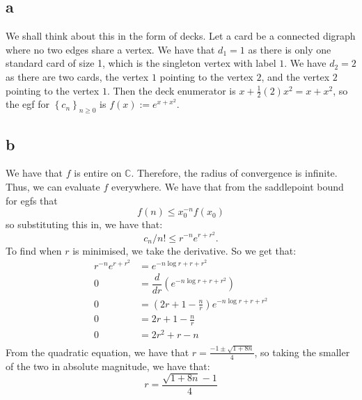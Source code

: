 \documentclass[]{article}
\begin{document}
\subsection{a}
We shall think about this in the form of decks. Let a card be a connected digraph where no two edges share a vertex. We have that $d_1 = 1$ as there is only one standard card of size 1, which is the singleton vertex with label $1$. We have $d_2 = 2$ as there are two cards, the vertex $1$ pointing to the vertex $2$, and the vertex $2$ pointing to the vertex $1$. Then the deck enumerator is $x + \frac{1}{2} (2) x^2 = x + x^2$, so the egf for $\left\{ c_n\right\}_{n \geq 0}$ is $f(x) := e^{x + x^2}$.

\subsection{b}
We have that $f$ is entire on $\mathbb{C}$. Therefore, the radius of convergence is infinite. Thus, we can evaluate $f$ everywhere. We have that from the saddlepoint bound for egfs that
\begin{equation}
	[x^n] f(n) \leq x_0^{-n} f(x_0)
\end{equation}
so substituting this in, we have that:
\begin{equation}
	c_n/n! \leq r^{-n} e^{r + r^2}.
\end{equation}
To find when $r$ is minimised, we take the derivative. So we get that:
\begin{align*}
	 r^{-n} e^{r + r^2} &= e^{-n \log r + r + r^2}\\
	 0 &= \dfrac{d}{dr}(e^{-n \log r + r + r^2}) \\
	 0 &= \left(2r + 1 - \frac{n}{r}\right) e^{-n \log r + r + r^2}\\
	 0 &= 2r + 1 - \frac{n}{r}\\
	 0 &= 2r^2 + r - n\\
\end{align*}
From the quadratic equation, we have that $r = \frac{-1 \pm \sqrt{1 + 8n}}{4}$, so taking the smaller of the two in absolute magnitude, we have that:
\begin{equation}
	r = \frac{\sqrt{1 + 8n} - 1}{4}
\end{equation}
\end{document}
